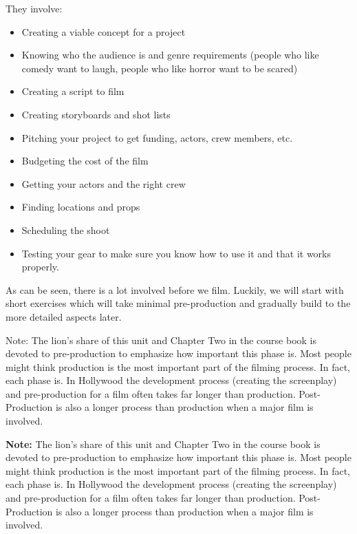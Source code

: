 \documentclass[
]{book}
\providecommand{\tightlist}{%
  \setlength{\itemsep}{0pt}\setlength{\parskip}{0pt}}
\begin{document}
They involve:

\begin{itemize}
\tightlist
\item
  Creating a viable concept for a project\\
\item
  Knowing who the audience is and genre requirements (people who like comedy want to laugh, people who like horror want to be scared)\\
\item
  Creating a script to film\\
\item
  Creating storyboards and shot lists\\
\item
  Pitching your project to get funding, actors, crew members, etc.\\
\item
  Budgeting the cost of the film\\
\item
  Getting your actors and the right crew\\
\item
  Finding locations and props\\
\item
  Scheduling the shoot\\
\item
  Testing your gear to make sure you know how to use it and that it works properly.
\end{itemize}

As can be seen, there is a lot involved before we film. Luckily, we will start with short exercises which will take minimal pre-production and gradually build to the more detailed aspects later.

Note: The lion's share of this unit and Chapter Two in the course book is devoted to pre-production to emphasize how important this phase is. Most people might think production is the most important part of the filming process. In fact, each phase is. In Hollywood the development process (creating the screenplay) and pre-production for a film often takes far longer than production. Post-Production is also a longer process than production when a major film is involved.

\textbf{Note:} The lion's share of this unit and Chapter Two in the course book is devoted to pre-production to emphasize how important this phase is. Most people might think production is the most important part of the filming process. In fact, each phase is. In Hollywood the development process (creating the screenplay) and pre-production for a film often takes far longer than production. Post-Production is also a longer process than production when a major film is involved.
\end{document}
